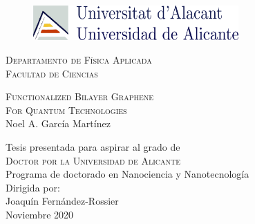\begin{titlepage}

\vspace{20pt}
\begin{figure}[!ht]
\centering
\includegraphics[width=0.7\textwidth]{logo_ua.pdf}
\end{figure}

\begin{center}
\begingroup \linespread{1,75} 
\textsc{\large{Departamento de Física Aplicada}}\\
\textsc{\large{Facultad de Ciencias}}\\[1,5cm]
\endgroup

\begingroup \linespread{1,75} \selectfont
\textsc{{\LARGE
      Functionalized Bilayer Graphene\\
      For Quantum Technologies}}\\[1,5cm]
Noel A. García Martínez\\[2,5cm]
\endgroup

Tesis presentada para aspirar al grado de\\
\textsc{Doctor por la Universidad de Alicante}\\[1.5cm]
Programa de doctorado en Nanociencia y Nanotecnología\\[2cm]

Dirigida por:\\
Joaquín Fernández-Rossier\\[2cm]

Noviembre 2020
\end{center}

\vfill
\end{titlepage}
